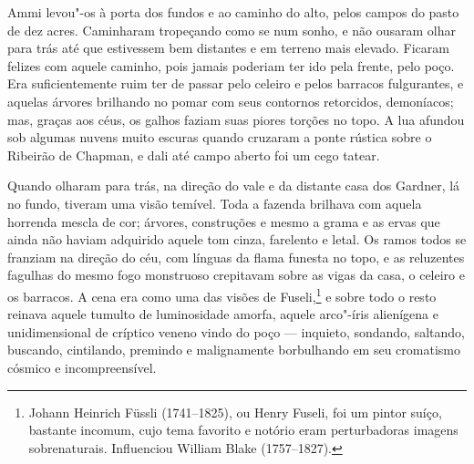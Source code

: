 Ammi levou"-os à porta dos fundos e ao caminho do alto, pelos campos do
pasto de dez acres. Caminharam tropeçando como se num sonho, e não
ousaram olhar para trás até que estivessem bem distantes e em terreno
mais elevado. Ficaram felizes com aquele caminho, pois jamais poderiam
ter ido pela frente, pelo poço. Era suficientemente ruim ter de passar
pelo celeiro e pelos barracos fulgurantes, e aquelas árvores brilhando
no pomar com seus contornos retorcidos, demoníacos; mas, graças aos
céus, os galhos faziam suas piores torções no topo. A lua afundou sob
algumas nuvens muito escuras quando cruzaram a ponte rústica sobre o
Ribeirão de Chapman, e dali até campo aberto foi um cego tatear.

Quando olharam para trás, na direção do vale e da distante casa dos
Gardner, lá no fundo, tiveram uma visão temível. Toda a fazenda brilhava
com aquela horrenda mescla de cor; árvores, construções e mesmo a grama
e as ervas que ainda não haviam adquirido aquele tom cinza, farelento e
letal. Os ramos todos se franziam na direção do céu, com línguas da
flama funesta no topo, e as reluzentes fagulhas do mesmo fogo monstruoso
crepitavam sobre as vigas da casa, o celeiro e os barracos. A cena era
como uma das visões de Fuseli,\footnote{Johann Heinrich Füssli
  (1741--1825), ou Henry Fuseli, foi um pintor suíço, bastante incomum,
  cujo tema favorito e notório eram perturbadoras imagens sobrenaturais.
  Influenciou William Blake (1757--1827).} e sobre todo o resto reinava
aquele tumulto de luminosidade amorfa, aquele arco"-íris alienígena e
unidimensional de críptico veneno vindo do poço --- inquieto, sondando,
saltando, buscando, cintilando, premindo e malignamente borbulhando em
seu cromatismo cósmico e incompreensível.

